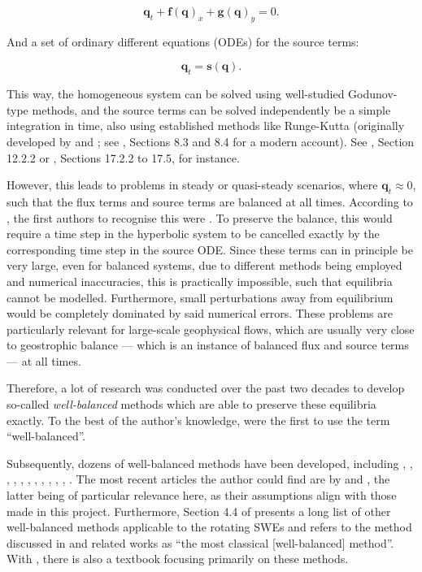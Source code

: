 \documentclass[a4paper,onecolumn,11pt]{article}
\renewcommand{\vec}[1]{\ensuremath{\mathbf{#1}}}
\begin{document}
$$
    \vec{q}_t + \vec{f}(\vec{q})_x + \vec{g}(\vec{q})_y = 0.
$$

And a set of ordinary different equations (ODEs) for the source terms:

$$
    \vec{q}_t = \vec{s}(\vec{q}).
$$

This way, the homogeneous system can be solved using well-studied Godunov-type methods, and the source terms can be solved independently be a simple integration in time, also using established methods like Runge-Kutta (originally developed by \citet{runge1895numerische} and \citet{kutta1901beitrag}; see \citet{kaw2009numerical}, Sections 8.3 and 8.4 for a modern account). See \citet{toro2001shock}, Section 12.2.2 or \citet{leveque2002finite}, Sections 17.2.2 to 17.5, for instance.

However, this leads to problems in steady or quasi-steady scenarios, where $\vec{q}_t \approx 0$, such that the flux terms and source terms are balanced at all times. According to \citet{toro2007godunov}, the first authors to recognise this were \citet{glimm1984generalized}. To preserve the balance, this would require a time step in the hyperbolic system to be cancelled exactly by the corresponding time step in the source ODE. Since these terms can in principle be very large, even for balanced systems, due to different methods being employed and numerical inaccuracies, this is practically impossible, such that equilibria cannot be modelled. Furthermore, small perturbations away from equilibrium would be completely dominated by said numerical errors. These problems are particularly relevant for large-scale geophysical flows, which are usually very close to geostrophic balance --- which is an instance of balanced flux and source terms --- at all times.

Therefore, a lot of research was conducted over the past two decades to develop so-called \emph{well-balanced} methods which are able to preserve these equilibria exactly. To the best of the author's knowledge, \citet{greenberg1996well} were the first to use the term ``well-balanced''.

Subsequently, dozens of well-balanced methods have been developed, including \citet{leveque1998balancing}, \citet{garcia2000numerical}, \citet{hubbard2000flux}, \citet{burguete2001efficient}, \citet{gascon2001construction}, \citet{rogers2001adaptive}, \citet{bale2003wave}, \citet{rogers2003mathematical}, \citet{audusse2004fast}, \citet{chinnayya2004well}, \citet{liang2009adaptive}, \citet{liang2009numerical}. The most recent articles the author could find are by \citet{zhang2014well} and \citet{chertockwell}, the latter being of particular relevance here, as their assumptions align with those made in this project. Furthermore, Section 4.4 of \citet{zeitlin2007nonlinear} presents a long list of other well-balanced methods applicable to the rotating SWEs and refers to the method discussed in \citet{audusse2004fast} and related works as ``the most classical [well-balanced] method''. With \citet{bouchut2004nonlinear}, there is also a textbook focusing primarily on these methods.
\end{document}
